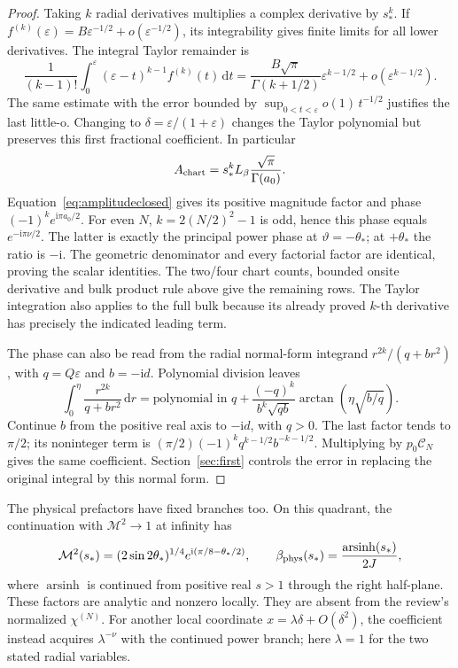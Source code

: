 \documentclass[11pt]{article}
\numberwithin{equation}{section}
\theoremstyle{definition}
\newcommand{\dd}{\,\mathrm d}
\newcommand{\ii}{\mathrm i}
\newcommand{\eps}{\varepsilon}
\newcommand{\M}{\mathcal M}
\begin{document}
\begin{proof}
Taking \(k\) radial derivatives multiplies a complex derivative by
\(s_*^k\). If \(f^{(k)}(\eps)=B\eps^{-1/2}+o(\eps^{-1/2})\),
its integrability gives finite limits for all lower derivatives.
The integral Taylor remainder is
\[
 \frac1{(k-1)!}\int_0^\eps(\eps-t)^{k-1}f^{(k)}(t)\dd t
 =\frac{B\sqrt\pi}{\Gamma(k+1/2)}\eps^{k-1/2}
       +o(\eps^{k-1/2}).
\]
The same estimate with the error bounded by
\(\sup_{0<t<\eps}o(1)\,t^{-1/2}\) justifies the last little-o.
Changing to \(\delta=\eps/(1+\eps)\) changes the Taylor polynomial
but preserves this first fractional coefficient. In particular
\[
 A_{\rm chart}=s_*^kL_\beta\frac{\sqrt\pi}{\Gamma(a_0)}.
\]
Equation~\eqref{eq:amplitudeclosed} gives its positive magnitude
factor and phase \((-1)^ke^{\ii\pi a_0/2}\).
For even \(N\), \(k=2(N/2)^2-1\) is odd, hence this phase equals
\(e^{-\ii\pi\nu/2}\). The latter is exactly the principal power
phase at \(\vartheta=-\theta_*\); at \(+\theta_*\) the ratio is
\(-\ii\). The geometric denominator and every factorial factor
are identical, proving the scalar identities.
The two/four chart counts, bounded onsite derivative and bulk
product rule above give the remaining rows. The Taylor integration
also applies to the full bulk because its already proved \(k\)-th
derivative has precisely the indicated leading term.

The phase can also be read from the radial normal-form integrand
\(r^{2k}/(q+b r^2)\), with \(q=Q\eps\) and \(b=-\ii d\).
Polynomial division leaves
\[
 \int_0^\eta\frac{r^{2k}}{q+b r^2}\dd r
 =\text{polynomial in }q+
 \frac{(-q)^k}{b^k\sqrt{qb}}
             \arctan\!\left(\eta\sqrt{b/q}\right).
\]
Continue \(b\) from the positive real axis to \(-\ii d\), with
\(q>0\). The last factor tends to \(\pi/2\); its noninteger term
is \((\pi/2)(-1)^kq^{k-1/2}b^{-k-1/2}\).
Multiplying by \(p_0\mathscr C_N\) gives the same coefficient.
Section~\ref{sec:first} controls the error in replacing the original
integral by this normal form.
\end{proof}

The physical prefactors have fixed branches too. On this quadrant,
the continuation with \(\M^2\to1\) at infinity has
\[
 \M^2(s_*)=(2\sin2\theta_*)^{1/4}
             e^{\ii(\pi/8-\theta_*/2)},\qquad
 \beta_{\rm phys}(s_*)=\frac{\operatorname{arsinh}(s_*)}{2J},
\]
where \(\operatorname{arsinh}\) is continued from positive real
\(s>1\) through the right half-plane. These factors are analytic
and nonzero locally. They are absent from the review's normalized
\(\chi^{(N)}\). For another local coordinate
\(x=\lambda\delta+O(\delta^2)\), the coefficient instead acquires
\(\lambda^{-\nu}\) with the continued power branch; here
\(\lambda=1\) for the two stated radial variables.
\end{document}
